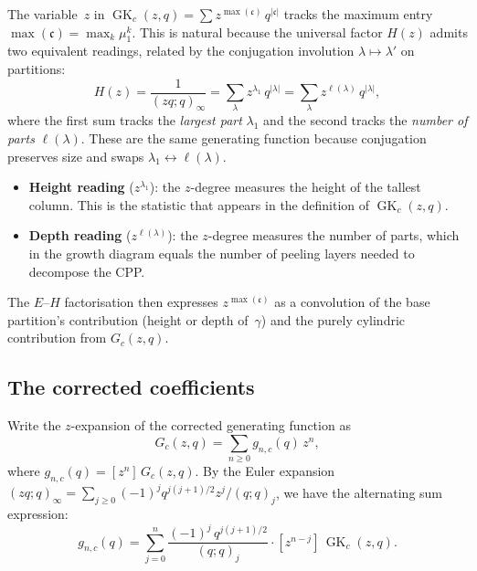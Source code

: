 \documentclass[11pt]{article}
\theoremstyle{plain}
\theoremstyle{definition}
\newcommand{\GK}{\operatorname{GK}}
\newcommand{\qpoch}[2]{(#1;#2)_\infty}
\newcommand{\qpochn}[3]{(#1;#2)_{#3}}
\begin{document}
The variable~$z$ in $\GK_c(z,q) = \sum z^{\max(\mathfrak{c})}\, q^{|\mathfrak{c}|}$
tracks the maximum entry $\max(\mathfrak{c}) = \max_k \mu^k_1$.  This is
natural because the universal factor $H(z)$ admits two equivalent readings,
related by the conjugation involution $\lambda \mapsto \lambda'$ on
partitions:
\begin{equation}\label{eq:Hz-two-readings}
  H(z) = \frac{1}{\qpoch{zq}{q}}
  = \sum_\lambda z^{\lambda_1}\, q^{|\lambda|}
  = \sum_\lambda z^{\ell(\lambda)}\, q^{|\lambda|},
\end{equation}
where the first sum tracks the \emph{largest part} $\lambda_1$ and the
second tracks the \emph{number of parts} $\ell(\lambda)$.  These are the
same generating function because conjugation preserves size and swaps
$\lambda_1 \leftrightarrow \ell(\lambda)$.

\begin{itemize}
  \item \textbf{Height reading} ($z^{\lambda_1}$): the $z$-degree
    measures the height of the tallest column.  This is the statistic
    that appears in the definition of $\GK_c(z,q)$.
  \item \textbf{Depth reading} ($z^{\ell(\lambda)}$): the $z$-degree
    measures the number of parts, which in the growth diagram equals the
    number of peeling layers needed to decompose the CPP.
\end{itemize}

The $E$--$H$ factorisation then expresses $z^{\max(\mathfrak{c})}$ as a
convolution of the base partition's contribution (height or depth of~$\gamma$)
and the purely cylindric contribution from $G_c(z,q)$.

\subsection{The corrected coefficients}

Write the $z$-expansion of the corrected generating function as
\begin{equation}
  G_c(z,q) = \sum_{n \geq 0} g_{n,c}(q)\, z^n,
  \label{eq:gn-def}
\end{equation}
where $g_{n,c}(q) = [z^n]\,G_c(z,q)$.  By the Euler expansion
$\qpoch{zq}{q} = \sum_{j \geq 0} (-1)^j q^{j(j+1)/2} z^j / \qpochn{q}{q}{j}$,
we have the alternating sum expression:
\begin{equation}
  g_{n,c}(q)
  = \sum_{j=0}^{n} \frac{(-1)^j\, q^{j(j+1)/2}}{\qpochn{q}{q}{j}}
    \cdot [z^{n-j}]\,\GK_c(z,q).
  \label{eq:gn-alt-sum}
\end{equation}
\end{document}
